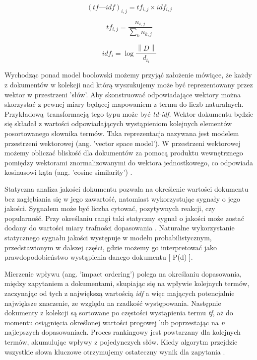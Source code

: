 \begin{equation}
	(tf—idf)_{i,j} = tf_{i,j} \times idf_{i,j}
\end{equation}

\begin{equation}
		tf_{i,j} = \frac{n_{i,j}}{\sum_{k} n_{k,j}}
\end{equation}

\begin{equation}
	idf_i = \log \frac{\left\| D \right\|}{d_{t_i}}
\end{equation}

Wychodząc ponad model boolowski możemy przyjąć założenie mówiące, że każdy z
dokumentów w kolekcji nad którą wyszukujemy może być reprezentowany przez wektor w przestrzeni
'słów'. Aby skonstruować odpowiadające wektory można skorzystać z pewnej miary będącej
mapowaniem z termu do liczb naturalnych. Przykładową transformacją tego typu może być {\it td-idf}.
Wektor dokumentu będzie się składał z wartości odpowiadających wystąpieniom kolejnych elementów posortowanego słownika termów. Taka reprezentacja nazywana jest modelem przestrzeni wektorowej (ang. 'vector space model'). W przestrzeni wektorowej
możemy obliczać bliskość dla dokumentów za pomocą produktu wewnętrznego pomiędzy wektorami znormalizowanymi do
wektora jednostkowego, co odpowiada kosinusowi kąta (ang. 'cosine
similarity') \autocite[s. 157-160]{introtoinformationretrieval}.\newline

Statyczna analiza jakości dokumentu pozwala na określenie wartości dokumentu bez
zagłębiania się w jego zawartość, natomiast wykorzystując sygnały o jego jakości. Sygnałem może być
liczba cytować, pozytywnych reakcji, czy popularność. Przy określaniu rangi taki statyczny sygnał o jakości
może zostać dodany do wartości miary trafności dopasowania \autocite[s. 175-177]{introtoinformationretrieval}. Naturalne wykorzystanie statycznego sygnału
jakości występuje w modelu probabilistycznym, przedstawionym w dalszej części, gdzie możemy go
interpretować jako prawdopodobieństwo wystąpienia danego dokumentu [ P(d) ].\newline

Mierzenie wpływu (ang. 'impact ordering') polega na określaniu dopasowania, między
zapytaniem a dokumentami, skupiając się na wpływie kolejnych termów, zaczynając od tych z
największą wartością {\it idf} a więc mających potencjalnie największe znaczenie, ze względu na rzadkość występowania. Następnie dokumenty z
kolekcji są sortowane po częstości wystąpienia termu {\it tf}, aż do momentu osiągnięcia określonej wartości
progowej lub poprzestając na {\it n} najlepszych dopasowaniach. Proces rankingowy jest
powtarzany dla kolejnych termów, akumulując wpływy z pojedynczych słów. Kiedy algorytm przejdzie
wszystkie słowa kluczowe otrzymujemy ostateczny wynik dla zapytania \autocite[s. 177-178]{introtoinformationretrieval}.\newline

